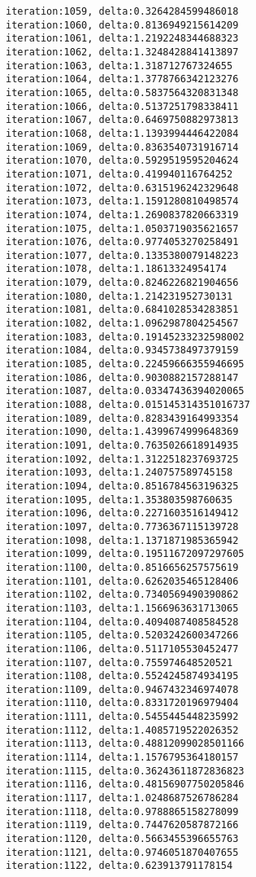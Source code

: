 \documentclass[11pt]{article}
\begin{document}
\begin{Verbatim}[commandchars=\\\{\}]
iteration:1059, delta:0.3264284599486018
iteration:1060, delta:0.8136949215614209
iteration:1061, delta:1.2192248344688323
iteration:1062, delta:1.3248428841413897
iteration:1063, delta:1.318712767324655
iteration:1064, delta:1.3778766342123276
iteration:1065, delta:0.5837564320831348
iteration:1066, delta:0.5137251798338411
iteration:1067, delta:0.6469750882973813
iteration:1068, delta:1.1393994446422084
iteration:1069, delta:0.8363540731916714
iteration:1070, delta:0.5929519595204624
iteration:1071, delta:0.419940116764252
iteration:1072, delta:0.6315196242329648
iteration:1073, delta:1.1591280810498574
iteration:1074, delta:1.2690837820663319
iteration:1075, delta:1.0503719035621657
iteration:1076, delta:0.9774053270258491
iteration:1077, delta:0.1335380079148223
iteration:1078, delta:1.18613324954174
iteration:1079, delta:0.8246226821904656
iteration:1080, delta:1.214231952730131
iteration:1081, delta:0.6841028534283851
iteration:1082, delta:1.0962987804254567
iteration:1083, delta:0.19145233232598002
iteration:1084, delta:0.9345738497379159
iteration:1085, delta:0.22459666355946695
iteration:1086, delta:0.9030882157288147
iteration:1087, delta:0.03347436394020065
iteration:1088, delta:0.015145314351016737
iteration:1089, delta:0.8283439164993354
iteration:1090, delta:1.4399674999648369
iteration:1091, delta:0.7635026618914935
iteration:1092, delta:1.3122518237693725
iteration:1093, delta:1.240757589745158
iteration:1094, delta:0.8516784563196325
iteration:1095, delta:1.353803598760635
iteration:1096, delta:0.2271603516149412
iteration:1097, delta:0.7736367115139728
iteration:1098, delta:1.1371871985365942
iteration:1099, delta:0.19511672097297605
iteration:1100, delta:0.8516656257575619
iteration:1101, delta:0.6262035465128406
iteration:1102, delta:0.7340569490390862
iteration:1103, delta:1.1566963631713065
iteration:1104, delta:0.4094087408584528
iteration:1105, delta:0.5203242600347266
iteration:1106, delta:0.5117105530452477
iteration:1107, delta:0.755974648520521
iteration:1108, delta:0.5524245874934195
iteration:1109, delta:0.9467432346974078
iteration:1110, delta:0.8331720196979404
iteration:1111, delta:0.5455445448235992
iteration:1112, delta:1.4085719522026352
iteration:1113, delta:0.48812099028501166
iteration:1114, delta:1.1576795364180157
iteration:1115, delta:0.36243611872836823
iteration:1116, delta:0.48156907750205846
iteration:1117, delta:1.0248687526786284
iteration:1118, delta:0.9788865158278099
iteration:1119, delta:0.7447620587872166
iteration:1120, delta:0.5663455396655763
iteration:1121, delta:0.9746051870407655
iteration:1122, delta:0.623913791178154

\end{Verbatim}
\end{document}
